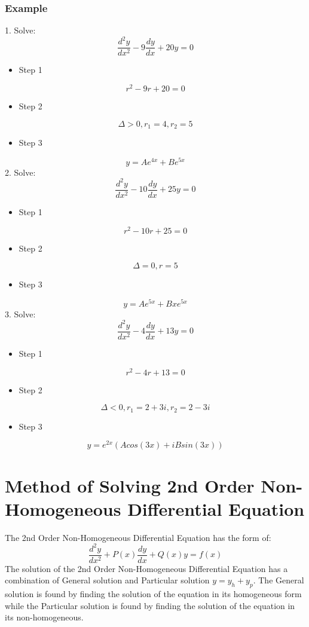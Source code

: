 \documentclass[12pt,a4paper]{article}
\begin{document}
	\subsubsection{Example}
	1. Solve:
	\[
	\frac{d^2y}{dx^2} -9\frac{dy}{dx} + 20 y = 0
	\]
	\begin{itemize}
		\item Step 1
	\end{itemize}
	\[
	r^2 -9r + 20 =0
	\]
	\begin{itemize}
		\item Step 2
	\end{itemize}
	\[
	\Delta > 0, r_1 = 4, r_2 = 5
	\]
	\begin{itemize}
		\item Step 3
	\end{itemize}
	\[
	y = Ae^{4x} + Be^{5x}
	\]
	2. Solve:
	\[
	\frac{d^2y}{dx^2} -10\frac{dy}{dx} + 25 y = 0
	\]
	\begin{itemize}
		\item Step 1
	\end{itemize}
	\[
	r^2 -10r + 25 =0
	\]
	\begin{itemize}
		\item Step 2
	\end{itemize}
	\[
	\Delta = 0, r = 5
	\]
	\begin{itemize}
		\item Step 3
	\end{itemize}
	\[
	y = Ae^{5x} + Bxe^{5x}
	\]
	3. Solve:
	\[
	\frac{d^2y}{dx^2} -4\frac{dy}{dx} + 13 y = 0
	\]
	\begin{itemize}
		\item Step 1
	\end{itemize}
	\[
	r^2 -4r + 13 =0
	\]
	\begin{itemize}
		\item Step 2
	\end{itemize}
	\[
	\Delta < 0, r_1 = 2+3i, r_2 = 2-3i
	\]
	\begin{itemize}
		\item Step 3
	\end{itemize}
	\[
	y = e^{2 x}(A cos (3 x) + iB sin (3 x))
	\]
	
	
	
	
	\section{Method of Solving 2nd Order Non-Homogeneous Differential Equation}
	The 2nd Order Non-Homogeneous Differential Equation has the form of:
	\[
	\frac{d^2y}{dx^2} + P(x)\frac{dy}{dx} + Q(x) y = f(x)
	\]
	The solution of the 2nd Order Non-Homogeneous Differential Equation has a combination of General solution and Particular solution \(y = y_h + y_p\). The General solution is found by finding the solution of the equation in its homogeneous form while the Particular solution is found by finding the solution of the equation in its non-homogeneous.
	
\end{document}
